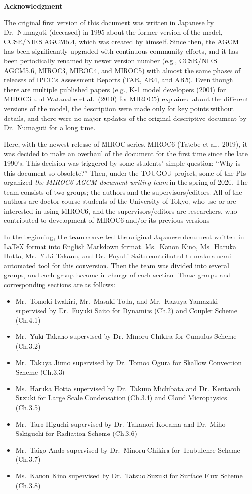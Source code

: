 \textbf{Acknowledgment}

The original first version of this document was written in Japanese by Dr.~Numaguti (deceased) in 1995 about the former version of the model, CCSR/NIES AGCM5.4, which was created by himself. Since
then, the AGCM has been significantly upgraded with continuous community efforts, and it has been periodically renamed by newer version number (e.g., CCSR/NIES AGCM5.6, MIROC3, MIROC4, and MIROC5)
with almost the same phases of releases of IPCC's Assessment Reports (TAR, AR4, and AR5). Even though there are multiple published papers (e.g., K-1 model developers (2004) for MIROC3 and Watanabe et
al.~(2010) for MIROC5) explained about the different versions of the model, the description were made only for key points without details, and there were no major updates of the original descriptive
document by Dr.~Numaguti for a long time.

Here, with the newest release of MIROC series, MIROC6 (Tatebe et al., 2019), it was decided to make an overhaul of the document for the first time since the late 1990's. This decision was triggered by
some students' simple question: ``Why is this document so obsolete?'' Then, under the TOUGOU project, some of the PIs organized \emph{the MIROC6 AGCM document writing team} in the spring of 2020. The
team consists of two groups; the authors and the supervisors/editors. All of the authors are doctor course students of the University of Tokyo, who use or are interested in using MIROC6, and the
supervisors/editors are researchers, who contributed to development of MIROC6 and/or its previous versions.

In the beginning, the team converted the original Japanese document written in LaTeX format into English Markdown format. Ms.~Kanon Kino, Ms.~Haruka Hotta, Mr.~Yuki Takano, and Dr.~Fuyuki Saito
contributed to make a semi-automated tool for this conversion. Then the team was divided into several groups, and each group became in charge of each section. These groups and corresponding sections
are as follows:

\begin{itemize}
\item
  Mr.~Tomoki Iwakiri, Mr.~Masaki Toda, and Mr.~Kazuya Yamazaki supervised by Dr.~Fuyuki Saito for Dynamics (Ch.2) and Coupler Scheme (Ch.4.1)
\item
  Mr.~Yuki Takano supervised by Dr.~Minoru Chikira for Cumulus Scheme (Ch.3.2)
\item
  Mr.~Takuya Jinno supervised by Dr.~Tomoo Ogura for Shallow Convection Scheme (Ch.3.3)
\item
  Ms.~Haruka Hotta supervised by Dr.~Takuro Michibata and Dr.~Kentaroh Suzuki for Large Scale Condensation (Ch.3.4) and Cloud Microphysics (Ch.3.5)
\item
  Mr.~Taro Higuchi supervised by Dr.~Takanori Kodama and Dr.~Miho Sekiguchi for Radiation Scheme (Ch.3.6)
\item
  Mr.~Taigo Ando supervised by Dr.~Minoru Chikira for Trubulence Scheme (Ch.3.7)
\item
  Ms.~Kanon Kino supervised by Dr.~Tatsuo Suzuki for Surface Flux Scheme (Ch.3.8)
\end{itemize}

